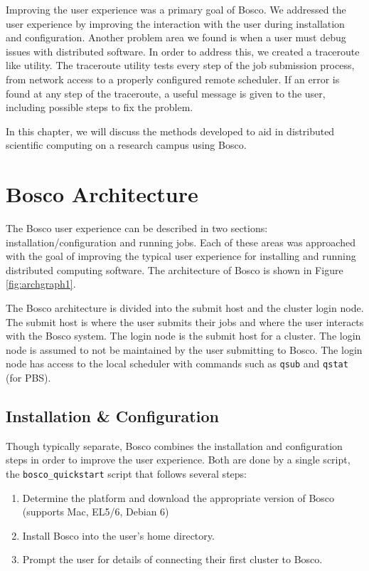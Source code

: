 Improving the user experience was a primary goal of Bosco.  We addressed the user experience by improving the interaction with the user during installation and configuration.  Another problem area we found is when a user must debug issues with distributed software.  In order to address this, we created a traceroute \cite{mao2003towards} like utility.  The traceroute utility tests every step of the job submission process, from network access to a properly configured remote scheduler.  If an error is found at any step of the traceroute, a useful message is given to the user, including possible steps to fix the problem.




In this chapter, we will discuss the methods developed to aid in distributed scientific computing on a research campus using Bosco.  

\section{Bosco Architecture}
\label{sec:boscoarch}

% 

The Bosco user experience can be described in two sections: installation/configuration and running jobs.  Each of these areas was approached with the goal of improving the typical user experience for installing and running distributed computing software.  The architecture of Bosco is shown in Figure \ref{fig:archgraph1}.

The Bosco architecture is divided into the submit host and the cluster login node.  The submit host is where the user submits their jobs and where the user interacts with the Bosco system.  The login node is the submit host for a cluster.  The login node is assumed to not be maintained by the user submitting to Bosco.  The login node has access to the local scheduler with commands such as \texttt{qsub} and \texttt{qstat} (for PBS). 

\subsection{Installation \& Configuration}
Though typically separate, Bosco combines the installation and configuration steps in order to improve the user experience.  Both are done by a single script, the \texttt{bosco\_quickstart} script that follows several steps:

\begin{enumerate}
\item Determine the platform and download the appropriate version of Bosco (supports Mac, EL5/6, Debian 6)
\item Install Bosco into the user's home directory.
\item Prompt the user for details of connecting their first cluster to Bosco.
\end{enumerate}

